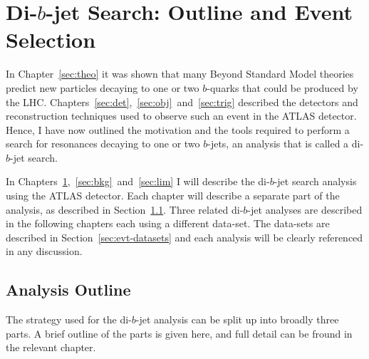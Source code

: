 \chapter{Di-$b$-jet Search: Outline and Event Selection}
\label{sec:evt}

In Chapter~\ref{sec:theo} it was shown that many Beyond Standard Model theories
predict new particles decaying to one or two $b$-quarks that could be produced by the LHC.
Chapters~\ref{sec:det},~\ref{sec:obj}~and~\ref{sec:trig}
described the detectors and reconstruction techniques used to observe such an event in the ATLAS detector.
Hence, I have now outlined the motivation and the tools required to perform
a search for resonances decaying to one or two $b$-jets,
an analysis that is called a di-$b$-jet search.

In Chapters~\ref{sec:evt},~\ref{sec:bkg}~and~\ref{sec:lim}
I will describe the di-$b$-jet search analysis using the ATLAS detector.
Each chapter will describe a separate part of the analysis,
as described in Section~\ref{sec:evt-outline}.
Three related di-$b$-jet analyses are described in
the following chapters
each using a different data-set.
The data-sets are described in Section~\ref{sec:evt-datasets}
and each analysis will be clearly referenced in any discussion.

\section{Analysis Outline}
\label{sec:evt-outline}

The strategy used for the di-$b$-jet analysis
can be split up into broadly three parts.
A brief outline of the parts is given here,
and full detail can be fround in the relevant chapter.

